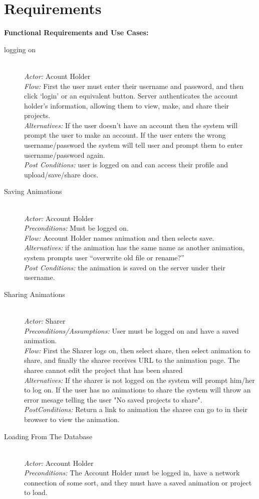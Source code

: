 \documentclass[12pt]{article}
\begin{document}
\section{Requirements}
\textbf{Functional Requirements and Use Cases:}
\begin{description}
\item[logging on] \hfill\\
   \textit{Actor:} Acount Holder\\
  \textit{Flow:} First the user must enter their username and password, and then click ‘login’ or an equivalent button. Server authenticates the account holder's information, allowing them to view, make, and share their projects.\\
\textit{Alternatives:} If the user doesn’t have an account then the system will prompt the user to make an account. If the user enters the wrong username/password the system will tell user and prompt them to enter username/password again.\\
\textit{Post Conditions:}
    user is logged on and can access their profile and upload/save/share docs.
\item[Saving Animations]\hfill\\
\textit{Actor:} Account Holder\\
\textit{Preconditions:} Must be logged on.\\
\textit{Flow:} Account Holder names animation and then selects save.\\
\textit{Alternatives:} if the animation has the same name as another animation, system prompts user “overwrite old file or rename?”\\
\textit{Post Conditions:} the animation is saved on the server under their username.\\
\item[Sharing Animations]\hfill\\
\textit{Actor:} Sharer\\
\textit{Preconditions/Assumptions:} User must be logged on and have a saved animation.\\
\textit{Flow:} First the Sharer logs on, then select share, then select animation to share, and finally the sharee receives URL to the animation page. The sharee cannot edit the project that has been shared\\
\textit{Alternatives:} If the sharer is not logged on the system will prompt him/her to log on. If the user has no animations to share the system will throw an error mesage telling the user "No saved projects to share".\\
\textit{PostConditions:} Return a link to animation the sharee can go to in their browser to view the animation.\\
\item[Loading From The Database]\hfill\\
\textit{Actor:} Account Holder\\
\textit{Preconditions:} The Account Holder must be logged in, have a network connection of some sort, and they must have a saved animation or project to load.\\


\end{description}
\end{document}

